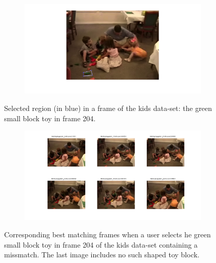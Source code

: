 \documentclass{paper}
\begin{document}
\begin{figure}[!htbp]
\centering
\begin{subfigure}{1.0\textwidth}
\includegraphics[width=\textwidth]{figures/region_queries/kids/selectionRegQ_204_fail}
\end{subfigure}
\caption{Selected region (in blue) in a frame of the kids data-set: the green small block toy in frame 204.}
\label{fig:kids_regionquery_sel3}
\end{figure}

\begin{figure}[!htbp]
\centering
\begin{subfigure}{1.0\textwidth}
\includegraphics[width=\textwidth]{figures/region_queries/kids/matchesRegQ_204_fail}
\end{subfigure}
\caption{Corresponding best matching frames when a user selects he green small block toy in frame 204 of the kids data-set containing a missmatch. The last image includes no such shaped toy block.}
\label{fig:kids_regionquery_matches_fail}
\end{figure}
\end{document}
